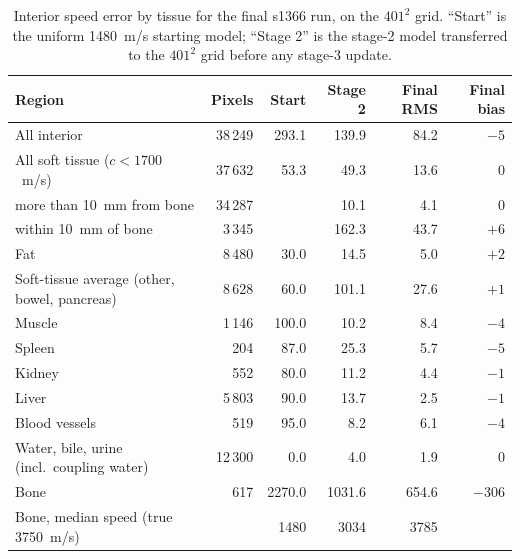 \documentclass[11pt]{article}
\begin{document}
\begin{table}[ht]
\centering
\small
\caption{Interior speed error by tissue for the final s1366 run, on the
  $401^2$ grid. ``Start'' is the uniform 1480~m/s starting model; ``Stage 2''
  is the stage-2 model transferred to the $401^2$ grid before any stage-3
  update.}
\label{tab:s1366_errors}
\begin{tabular}{@{}lrrrrr@{}}
\toprule
Region & Pixels & Start & Stage 2 & Final RMS & Final bias \\
\midrule
All interior & 38\,249 & 293.1 & 139.9 & 84.2 & $-5$ \\
All soft tissue ($c < 1700$~m/s) & 37\,632 & 53.3 & 49.3 & 13.6 & $0$ \\
\quad more than 10~mm from bone & 34\,287 & & 10.1 & 4.1 & $0$ \\
\quad within 10~mm of bone & 3\,345 & & 162.3 & 43.7 & $+6$ \\
\quad Fat & 8\,480 & 30.0 & 14.5 & 5.0 & $+2$ \\
\quad Soft-tissue average (other, bowel, pancreas) & 8\,628 & 60.0 & 101.1 & 27.6 & $+1$ \\
\quad Muscle & 1\,146 & 100.0 & 10.2 & 8.4 & $-4$ \\
\quad Spleen & 204 & 87.0 & 25.3 & 5.7 & $-5$ \\
\quad Kidney & 552 & 80.0 & 11.2 & 4.4 & $-1$ \\
\quad Liver & 5\,803 & 90.0 & 13.7 & 2.5 & $-1$ \\
\quad Blood vessels & 519 & 95.0 & 8.2 & 6.1 & $-4$ \\
\quad Water, bile, urine (incl.\ coupling water) & 12\,300 & 0.0 & 4.0 & 1.9 & $0$ \\
Bone & 617 & 2270.0 & 1031.6 & 654.6 & $-306$ \\
Bone, median speed (true 3750~m/s) & & 1480 & 3034 & 3785 & \\
\bottomrule
\end{tabular}
\end{table}
\end{document}
